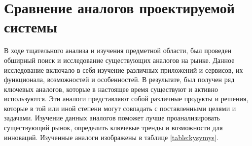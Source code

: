 \chapter{Сравнение аналогов проектируемой системы}
    В ходе тщательного анализа и изучения предметной области, %
    был проведен обширный поиск и исследование существующих аналогов %
    на рынке. Данное исследование включало в себя изучение различных приложений и %
    сервисов, их функционала, возможностей и особенностей. %
    В результате, был получен ряд ключевых аналогов, %
    которые в настоящее время существуют и активно используются. %
    Эти аналоги представляют собой различные продукты и решения, %
    которые в той или иной степени могут совпадать с поставленными целями %
    и задачами. Изучение данных аналогов поможет лучше проанализировать %
    существующий рынок, определить ключевые тренды и возможности для %
    инноваций. Изученные аналоги изображены в таблице \ref{table:kysymys}.
    
